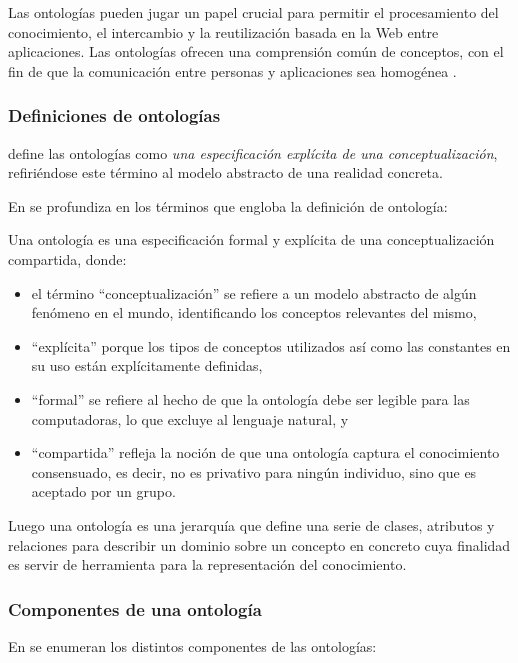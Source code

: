Las ontologías pueden jugar un papel crucial para permitir el procesamiento del
conocimiento, el intercambio y la reutilización basada en la Web entre
aplicaciones. Las ontologías ofrecen una comprensión común de conceptos, con el
fin de que la comunicación entre personas y aplicaciones sea homogénea
\cite{decker_semantic_2000}. 

\subsubsection{Definiciones de ontologías}

\cite{GRUBER} define las ontologías como \textit{una especificación explícita de
  una conceptualización}, refiriéndose este término al modelo abstracto de una
realidad concreta. 

En \cite{studer_knowledge_1998} se profundiza en los términos que engloba la
definición de ontología:

Una ontología es una especificación formal y explícita de una
   conceptualización compartida, donde:
 \begin{itemize}
 \item el término ``conceptualización'' se
   refiere a un modelo abstracto de algún fenómeno en el mundo, identificando
   los conceptos relevantes del mismo,
\item ``explícita'' porque los tipos de
   conceptos utilizados así como las constantes en su uso están explícitamente
   definidas,
\item ``formal'' se refiere al hecho de que la ontología debe ser
   legible para las computadoras, lo que excluye al lenguaje
   natural, y
\item  ``compartida'' refleja la noción de que una ontología captura el
   conocimiento consensuado, es decir, no es privativo para ningún individuo,
   sino que es aceptado por un grupo.

 \end{itemize}


Luego una ontología es una jerarquía que define una serie de clases, atributos y
relaciones para describir un dominio sobre un concepto en concreto cuya
finalidad es servir de herramienta para la representación del conocimiento. 


\subsubsection{Componentes de una ontología}

En \cite{PASTOR} se enumeran los distintos componentes de las ontologías: 

